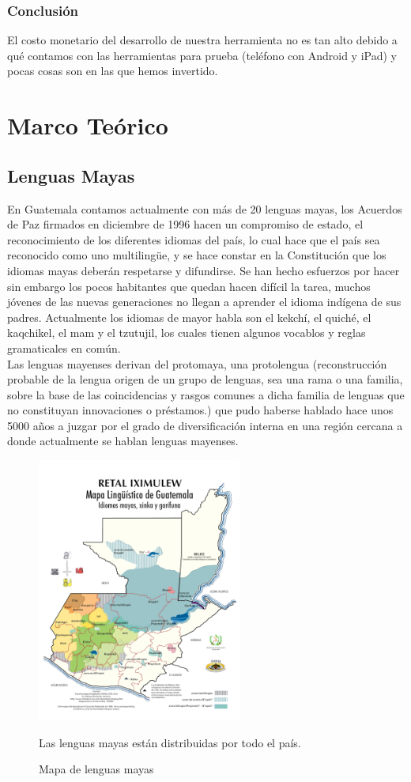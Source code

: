 \documentclass[a4paper,openright,11pt]{article}
\begin{document}
\subsubsection{Conclusión}
El costo monetario del desarrollo de nuestra herramienta no es tan alto debido a qué contamos con las herramientas para prueba (teléfono con Android y iPad) y pocas cosas son en las que hemos invertido.
\newpage

\section{Marco Teórico}
\subsection{Lenguas Mayas}
En Guatemala contamos actualmente con más de 20 lenguas mayas,  los Acuerdos de Paz firmados en diciembre de 1996 hacen un compromiso de estado, el reconocimiento de los diferentes idiomas del país, lo cual hace que el país sea reconocido como uno multilingüe, y se hace constar en la Constitución que los idiomas mayas deberán respetarse y difundirse. Se han hecho esfuerzos por hacer sin embargo los pocos habitantes que quedan hacen difícil la tarea, muchos jóvenes de las nuevas generaciones no llegan a aprender el idioma indígena de sus padres. Actualmente los idiomas de mayor habla son el kekchí, el quiché, el kaqchikel, el mam y el tzutujil, los cuales tienen algunos vocablos y reglas gramaticales en común. \\
 
Las lenguas mayenses derivan del protomaya, una protolengua (reconstrucción probable de la lengua origen de un grupo de lenguas, sea una rama o una familia, sobre la base de las coincidencias y rasgos comunes a dicha familia de lenguas que no constituyan innovaciones o préstamos.) que pudo haberse hablado hace unos 5000 años a juzgar por el grado de diversificación interna en una región cercana a donde actualmente se hablan lenguas mayenses.

\begin{figure}[H]
	\centering
	\includegraphics[width=0.6\textwidth]{mapa}
	\caption{Mapa de lenguas mayas}
	Las lenguas mayas están distribuidas por todo el país.
	\label{fig:map}
\end{figure}
\end{document}
